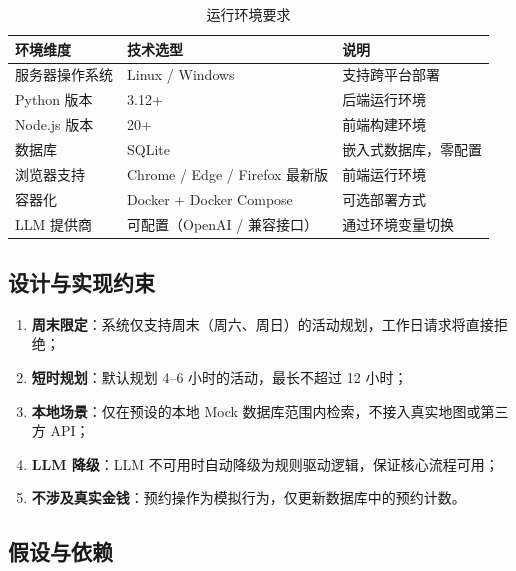\documentclass[12pt,a4paper]{ctexart}
\begin{document}
\begin{table}[ht]
\centering
\begin{tabular}{p{3cm}p{4cm}p{6cm}}
\toprule
\textbf{环境维度} & \textbf{技术选型} & \textbf{说明} \\
\midrule
服务器操作系统 & Linux / Windows & 支持跨平台部署 \\
Python 版本   & 3.12+            & 后端运行环境 \\
Node.js 版本  & 20+              & 前端构建环境 \\
数据库        & SQLite           & 嵌入式数据库，零配置 \\
浏览器支持    & Chrome / Edge / Firefox 最新版 & 前端运行环境 \\
容器化        & Docker + Docker Compose    & 可选部署方式 \\
LLM 提供商    & 可配置（OpenAI / 兼容接口） & 通过环境变量切换 \\
\bottomrule
\end{tabular}
\caption{运行环境要求}
\label{tab:environment}
\end{table}

\subsection{设计与实现约束}

\begin{enumerate}[label=(\arabic*)]
  \item \textbf{周末限定}：系统仅支持周末（周六、周日）的活动规划，工作日请求将直接拒绝；
  \item \textbf{短时规划}：默认规划 4--6 小时的活动，最长不超过 12 小时；
  \item \textbf{本地场景}：仅在预设的本地 Mock 数据库范围内检索，不接入真实地图或第三方 API；
  \item \textbf{LLM 降级}：LLM 不可用时自动降级为规则驱动逻辑，保证核心流程可用；
  \item \textbf{不涉及真实金钱}：预约操作为模拟行为，仅更新数据库中的预约计数。
\end{enumerate}

\subsection{假设与依赖}
\end{document}
